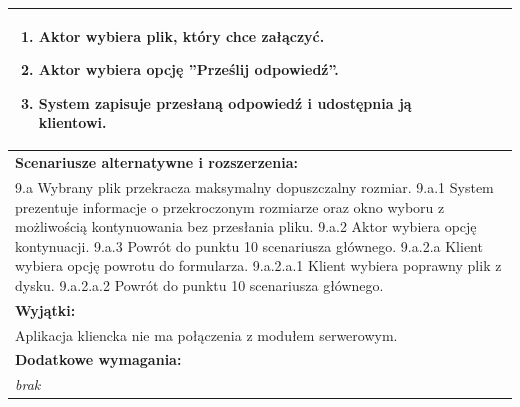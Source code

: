 \begin{center}
\begin{longtable}[h]{|p{1.6cm}|p{13.5cm}|}
{\begin{enumerate}
\item Aktor wybiera plik, który chce załączyć.
\item Aktor wybiera opcję ''Prześlij odpowiedź''.
\item System zapisuje przesłaną odpowiedź i udostępnia ją klientowi.
\end{enumerate}
} \\ \hline
\multicolumn{2}{|p{15.1cm}|}{\textbf{Scenariusze alternatywne i rozszerzenia:}} \\
\multicolumn{2}{|p{15.1cm}|}{
9.a Wybrany plik przekracza maksymalny dopuszczalny rozmiar. \newline
9.a.1 System prezentuje informacje o przekroczonym rozmiarze oraz okno wyboru z możliwością kontynuowania bez przesłania pliku. \newline
9.a.2 Aktor wybiera opcję kontynuacji. \newline
9.a.3 Powrót do punktu 10 scenariusza głównego.\newline
\newline
9.a.2.a Klient wybiera opcję powrotu do formularza. \newline
9.a.2.a.1 Klient wybiera poprawny plik z dysku. \newline
9.a.2.a.2 Powrót do punktu 10 scenariusza głównego.
} \\ \hline
\multicolumn{2}{|p{15.1cm}|}{\textbf{Wyjątki:}} \\
\multicolumn{2}{|p{15.1cm}|}{
Aplikacja kliencka nie ma połączenia z modułem serwerowym.
} \\ \hline
\multicolumn{2}{|p{15.1cm}|}{\textbf{Dodatkowe wymagania:}} \\
\multicolumn{2}{|p{15.1cm}|}{
\textit{brak}
} \\
\hline
\end{longtable}
\end{center}

